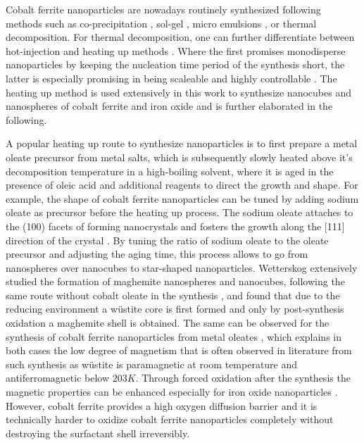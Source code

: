 \documentclass[\main/dresen_thesis.tex]{subfiles}
\begin{document}
  Cobalt ferrite nanoparticles are nowadays routinely synthesized following methods such as co-precipitation \cite{Fried_2001_Order}, sol-gel \cite{Niederberger_2009_Metal}, micro emulsions \cite{Pillai_1996_Synth}, or thermal decomposition.
  For thermal decomposition, one can further differentiate between hot-injection \cite{Hyeon_2003_Chemi} and heating up methods \cite{Embden_2015_TheHe}.
  Where the first promises monodisperse nanoparticles by keeping the nucleation time period of the synthesis short, the latter is especially promising in being scaleable and highly controllable \cite{Park_2004_Ultra}.
  The heating up method is used extensively in this work to synthesize nanocubes and nanospheres of cobalt ferrite and iron oxide and is further elaborated in the following.

  A popular heating up route to synthesize nanoparticles is to first prepare a metal oleate precursor from metal salts, which is subsequently slowly heated above it's decomposition temperature in a high-boiling solvent, where it is aged in the presence of oleic acid and additional reagents to direct the growth and shape.
  For example, the shape of cobalt ferrite nanoparticles can be tuned by adding sodium oleate as precursor before the heating up process.
  The sodium oleate attaches to the (100) facets of forming nanocrystals and fosters the growth along the [111] direction of the crystal \cite{Bao_2009_Forma}.
  By tuning the ratio of sodium oleate to the oleate precursor and adjusting the aging time, this process allows to go from nanospheres over nanocubes to star-shaped nanoparticles.
  Wetterskog \etal extensively studied the formation of maghemite nanospheres and nanocubes, following the same route without cobalt oleate in the synthesis \cite{Wetterskog_2014_Preci, Wetterskog_2013_Anoma}, and found that due to the reducing environment a w\"ustite core is first formed and only by post-synthesis oxidation a maghemite shell is obtained.
  The same can be observed for the synthesis of cobalt ferrite nanoparticles from metal oleates \cite{Bodnarchuk_2009_Excha}, which explains in both cases the low degree of magnetism that is often observed in literature from such synthesis as w\"ustite is paramagnetic at room temperature and antiferromagnetic below $203 \unit{K}$.
  Through forced oxidation after the synthesis the magnetic properties can be enhanced especially for iron oxide nanoparticles \cite{Wetterskog_2013_Anoma}.
  However, cobalt ferrite provides a high oxygen diffusion barrier \cite{Chen_2015_Synth} and it is technically harder to oxidize cobalt ferrite nanoparticles completely without destroying the surfactant shell irreversibly.
\end{document}
